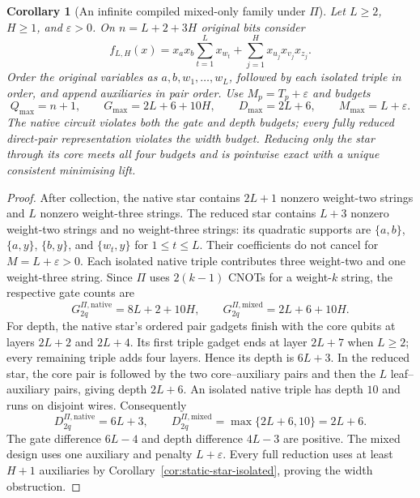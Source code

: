 \documentclass[a4paper,onecolumn,11pt,unpublished]{quantumarticle}
\newtheorem{corollary}[corollary]{Corollary}
\theoremstyle{remark}
\begin{document}
\begin{corollary}[An infinite compiled mixed-only family under $\Pi$]
\label{cor:compiled-star-isolated}
Let $L\geq2$, $H\geq1$, and $\varepsilon>0$. On
$n=L+2+3H$ original bits consider
\[
 f_{L,H}(x)=x_ax_b\sum_{t=1}^{L}x_{w_t}
              +\sum_{j=1}^{H}x_{u_j}x_{v_j}x_{z_j}.
\]
Order the original variables as $a,b,w_1,\ldots,w_L$, followed by each
isolated triple in order, and append auxiliaries in pair order.
Use $M_p=T_p+\varepsilon$ and budgets
\begin{equation}
 Q_{\max}=n+1,\qquad G_{\max}=2L+6+10H,\qquad
 D_{\max}=2L+6,\qquad M_{\max}=L+\varepsilon.
 \label{eq:compiled-mixed-only-budgets}
\end{equation}
The native circuit violates both the gate and depth budgets; every fully
reduced direct-pair representation violates the width budget. Reducing only
the star through its core meets all four budgets and is pointwise exact
with a unique consistent minimising lift.
\end{corollary}
\begin{proof}
After collection, the native star contains $2L+1$ nonzero weight-two strings
and $L$ nonzero weight-three strings. The reduced star contains $L+3$
nonzero weight-two strings and no weight-three strings: its quadratic
supports are $\{a,b\}$, $\{a,y\}$, $\{b,y\}$, and
$\{w_t,y\}$ for $1\leq t\leq L$. Their coefficients do not cancel for
$M=L+\varepsilon>0$. Each isolated native triple contributes three
weight-two and one weight-three string. Since $\Pi$ uses $2(k-1)$ CNOTs
for a weight-$k$ string, the respective gate counts are
\[
 G_{2q}^{\Pi,\mathrm{native}}=8L+2+10H,
 \qquad G_{2q}^{\Pi,\mathrm{mixed}}=2L+6+10H.
\]
For depth, the native star's ordered pair gadgets finish with the core
qubits at layers $2L+2$ and $2L+4$. Its first triple gadget ends at layer
$2L+7$ when $L\geq2$; every remaining triple adds four layers.
Hence its depth is $6L+3$. In the reduced star, the core pair is followed
by the two core--auxiliary pairs and then the $L$ leaf--auxiliary pairs,
giving depth $2L+6$. An isolated native triple has depth $10$ and runs on
disjoint wires. Consequently
\[
 D_{2q}^{\Pi,\mathrm{native}}=6L+3,
 \qquad D_{2q}^{\Pi,\mathrm{mixed}}=\max\{2L+6,10\}=2L+6.
\]
The gate difference $6L-4$ and depth difference $4L-3$ are positive.
The mixed design uses one auxiliary and penalty $L+\varepsilon$.
Every full reduction uses at least $H+1$ auxiliaries by
Corollary~\ref{cor:static-star-isolated}, proving the width obstruction.
\end{proof}
\end{document}
